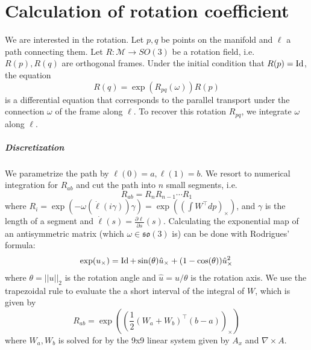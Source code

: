 \documentclass[../thesis.tex]{subfiles}
\begin{document}
\newcommand{\str}[1]{\textsc{#1}}
\newcommand{\var}[1]{\textit{#1}}
\newcommand{\op}[1]{\textsl{#1}}
\def \ifempty#1{\def\temp{#1} \ifx\temp\empty }
\newcommand{\msg}[2]{\ensuremath{\ifempty{#2} [\str{#1}] \else [\str{#1}, {#2}] \fi}}
\newcommand{\tup}[1]{\ensuremath{\langle #1 \rangle}}
\newcommand{\nil}{\ensuremath{\bot}}
\newcommand{\false}{\textsc{false}\xspace}
\newcommand{\true}{\textsc{true}\xspace}

\newcommand\lastts{\var{lastts}\xspace}
\newcommand\nextts{\var{nextts}\xspace}
\newcommand\trusted{\var{trusted}\xspace}
\newcommand\newepoch{\var{newepoch}\xspace}
\newcommand\leader{\var{leader}\xspace}
\newcommand\ts{\var{ts}\xspace}
\newcommand{\CK}{\ensuremath{\mathcal{K}}\xspace}
\newcommand{\CP}{\ensuremath{\mathcal{P}}\xspace}
\newcommand{\CQ}{\ensuremath{\mathcal{Q}}\xspace}


\chapter{Calculation of rotation coefficient}
\label{ch:calculation}
We are interested in the rotation.
Let $p,q$ be points on the manifold and $\ell$ a path connecting them.
Let $R: \mathcal{M} \to SO(3)$ be a rotation field, i.e. $R(p), R(q)$ are orthogonal frames.
Under the initial condition that $R(p)= \operatorname{Id}$, the equation
$$R(q)= \exp(R_{pq}(\omega))R(p)$$
is a differential equation that corresponds to the parallel transport under the connection $\omega$
of the frame along $\ell$.
To recover this rotation $R_{pq}$, we integrate $\omega$ along $\ell$.
\paragraph{Discretization}
We parametrize the path by $\ell(0)=a, \ell(1)=b$.
We resort to numerical integration for $R_{ab}$ and cut the path into $n$ small segments, i.e.
$$R_{ab}= R_nR_{n-1} \dotsb R_1$$
where $R_i = \exp(-\omega (\dot{\ell}(i\gamma))\gamma) = \exp((\int W^{\top}dp)_{\times})$, and $\gamma$ is the length of a segment and $\dot{\ell}(s)=\frac{\partial \ell}{\partial s}(s)$.
Calculating the exponential map of an antisymmetric matrix (which $\omega \in \mathfrak{so}(3)$ is) can be done with Rodrigues' formula:
$$\exp(u_{\times}) = \operatorname{Id} + \sin(\theta) \hat{u}_{\times} + (1-\cos(\theta)) \hat{u}_{\times}^2$$
where $\theta = ||u||_2$ is the rotation angle and $\hat{u}= u/\theta$ is the rotation axis.
We use the trapezoidal rule to evaluate the a short interval of the integral of $W$, which is given by
$$R_{ab}=\exp \left( \left(\frac{1}{2}(W_a + W_b)^{\top}(b-a)\right)_{\times}\right)$$
where $W_a, W_b$ is solved for by the 9x9 linear system given by $A_x$ and $\nabla \times A$.
\end{document}
